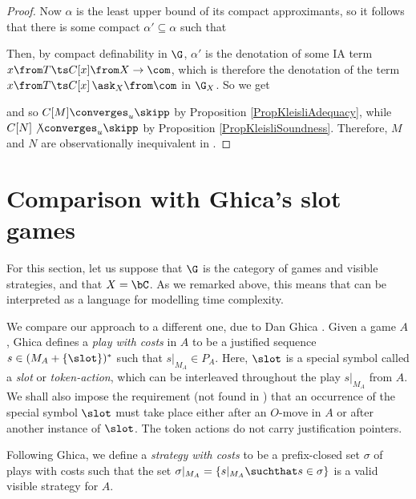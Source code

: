 \begin{proof}
  Now $\alpha$ is the least upper bound of its compact approximants, so it follows that there is some compact $\alpha'\subseteq \alpha$ such that
  Then, by compact definability in $\G$, $\alpha'$ is the denotation of some IA term $x\from T \ts C[x]\from X \to \com$, which is therefore the denotation of the term $x\from T \ts C[x]\,\ask_X \from \com$ in $\G_X$.
  So we get
  and so $C[M]\converges_u\skipp$ by Proposition \ref{PropKleisliAdequacy}, while $C[N] \not\converges_u \skipp$ by Proposition \ref{PropKleisliSoundness}.
  Therefore, $M$ and $N$ are observationally inequivalent in \IAX.
\end{proof}

\section{Comparison with Ghica's slot games}

For this section, let us suppose that $\G$ is the category of games and visible strategies, and that $X=\bC$.  
As we remarked above, this means that \IAX can be interpreted as a language for modelling time complexity.

We compare our approach to a different one, due to Dan Ghica \cite{SlotGames}.  
Given a game $A$, Ghica defines a \emph{play with costs} in $A$ to be a justified sequence $s\in (M_A + \{\slot\})^*$ such that $s\vert_{M_A}\in P_A$.
Here, $\slot$ is a special symbol called a \emph{slot} or \emph{token-action}, which can be interleaved throughout the play $s\vert_{M_A}$ from $A$.  
We shall also impose the requirement (not found in \cite{SlotGames}) that an occurrence of the special symbol $\slot$ must take place either after an $O$-move in $A$ or after another instance of $\slot$.
The token actions do not carry justification pointers.

Following Ghica, we define a \emph{strategy with costs} to be a prefix-closed set $\sigma$ of plays with costs such that the set $\sigma\vert_{M_A} = \{s\vert_{M_A}\suchthat s\in \sigma\}$ is a valid visible strategy for $A$.


